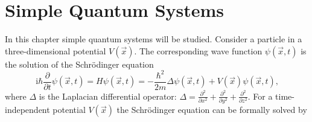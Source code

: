 \documentclass[10pt,a4paper]{article} %
\renewcommand{\i}{{\mathrm{i}}}
\begin{document}
    \title{\rmfamily\normalfont{}}
    \author{}
    \date{01.10.15} %
    	
    
    \maketitle
    
    \begin{abstract}
      Applying numerical methods in quantum mechanics has always been necessary in analyzing complex structures of quantum mechanical systems. The technical progress of computer performance has enabled physicists and mathematicians to simulate complex many-body systems. With these methods tangible progress in quantum physics can be made, to analyze quantum phenomena on the level of many-particle interactions. This article focuses on the implementation of numerical methods for many-body simulation in the functional programming language \textbf{Haskell}. Functional programming languages get more and more interesting for physicists through their mathematical way of implementation. In this article simple quantum systems are simulated first and an overview of different numerical methods for solving the Schrödinger equation will be given following an attempt to proceed to many-body systems from simple quantum systems. 
    \end{abstract}
       
    \tableofcontents
    
    \section{Simple Quantum Systems}\label{1}
   In this chapter simple quantum systems will be studied. Consider a particle in a three-dimensional potential $V(\vec{x})$. The corresponding wave function $\psi(\vec{x}, t)$ is the solution of the Schrödinger equation
   \begin{equation}
  \i \hbar \frac{\partial}{\partial t} \psi(\vec{x}, t) = H \psi(\vec{x}, t) = - \frac{\hbar^2}{2m}	\Delta \psi(\vec{x}, t)+  V(\vec{x}) \psi(\vec{x}, t) \text{,}
   \end{equation}
   where $\Delta$ is the Laplacian differential operator: $\Delta = \frac{\partial^2}{\partial x^2} +\frac{\partial^2}{\partial y^2} + \frac{\partial^2}{\partial z^2} $. For a time-independent potential $V(\vec{x})$ the Schrödinger equation can be formally solved by 
   
\end{document}
